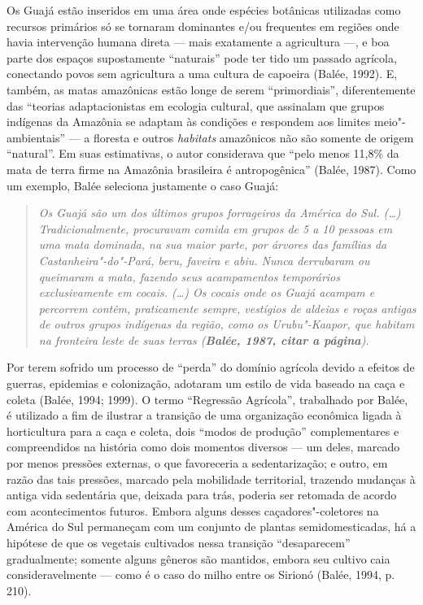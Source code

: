 Os Guajá estão inseridos em uma área onde espécies botânicas utilizadas
como recursos primários só se tornaram dominantes e/ou frequentes em
regiões onde havia intervenção humana direta --- mais exatamente a
agricultura ---, e boa parte dos espaços supostamente ``naturais'' pode
ter tido um passado agrícola, conectando povos sem agricultura a uma
cultura de capoeira (Balée, 1992). E, também, as matas amazônicas estão
longe de serem ``primordiais'', diferentemente das ``teorias
adaptacionistas em ecologia cultural, que assinalam que grupos indígenas
da Amazônia se adaptam às condições e respondem aos limites
meio"-ambientais'' --- a floresta e outros \emph{habitats} amazônicos não
são somente de origem ``natural''. Em suas estimativas, o autor
considerava que ``pelo menos 11,8\% da mata de terra firme na Amazônia
brasileira é antropogênica'' (Balée, 1987). Como um exemplo, Balée
seleciona justamente o caso Guajá:

\begin{quote}
\emph{Os Guajá são um dos últimos grupos forrageiros da América do Sul.
(\ldots{}) Tradicionalmente, procuravam comida em grupos de 5 a 10
pessoas em uma mata dominada, na sua maior parte, por árvores das
famílias da Castanheira"-do"-Pará, beru, faveira e abiu. Nunca derrubaram
ou queimaram a mata, fazendo seus acampamentos temporários
exclusivamente em cocais. (\ldots{}) Os cocais onde os Guajá acampam e
percorrem contêm, praticamente sempre, vestígios de aldeias e roças
antigas de outros grupos indígenas da região, como os Urubu"-Kaapor, que
habitam na fronteira leste de suas terras (\textbf{Balée, 1987, citar a
página}).}
\end{quote}

Por terem sofrido um processo de ``perda'' do domínio agrícola devido a
efeitos de guerras, epidemias e colonização, adotaram um estilo de vida
baseado na caça e coleta (Balée, 1994; 1999). O termo ``Regressão
Agrícola'', trabalhado por Balée, é utilizado a fim de ilustrar a
transição de uma organização econômica ligada à horticultura para a caça
e coleta, dois ``modos de produção'' complementares e compreendidos na
história como dois momentos diversos --- um deles, marcado por menos
pressões externas, o que favoreceria a sedentarização; e outro, em razão
das tais pressões, marcado pela mobilidade territorial, trazendo
mudanças à antiga vida sedentária que, deixada para trás, poderia ser
retomada de acordo com acontecimentos futuros. Embora alguns desses
caçadores"-coletores na América do Sul permaneçam com um conjunto de
plantas semidomesticadas, há a hipótese de que os vegetais cultivados
nessa transição ``desaparecem'' gradualmente; somente alguns gêneros são
mantidos, embora seu cultivo caia consideravelmente --- como é o caso do
milho entre os Sirionó (Balée, 1994, p. 210).


